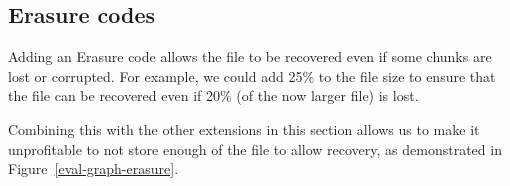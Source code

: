 \documentclass[12pt,a4paper,twoside,openright]{report}
\begin{document}
%
%
%
%
%
%

\subsection{Erasure codes}

Adding an Erasure code allows the file to be recovered even if some chunks are lost or corrupted.
For example, we could add 25\% to the file size to ensure that the file can be recovered even if 20\% (of the now larger file)
is lost.

Combining this with the other extensions in this section allows us to make it unprofitable to not store enough of the file to allow recovery,
as demonstrated in Figure~\ref{eval-graph-erasure}.
\end{document}
